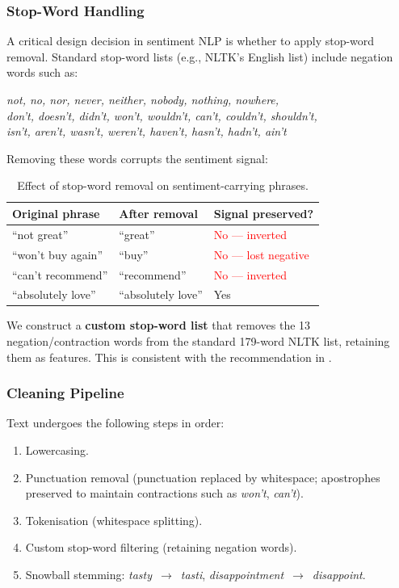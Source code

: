 \documentclass[11pt,a4paper]{article}
\begin{document}
\subsubsection{Stop-Word Handling}

A critical design decision in sentiment NLP is whether to apply
stop-word removal.
Standard stop-word lists (e.g., NLTK's English list) include negation words
such as:

\begin{center}
\textit{not, no, nor, never, neither, nobody, nothing, nowhere,\\
don't, doesn't, didn't, won't, wouldn't, can't, couldn't, shouldn't,\\
isn't, aren't, wasn't, weren't, haven't, hasn't, hadn't, ain't}
\end{center}

Removing these words corrupts the sentiment signal:

\begin{table}[H]
  \centering
  \caption{Effect of stop-word removal on sentiment-carrying phrases.}
  \label{tab:stopwords}
  \begin{tabular}{lll}
    \toprule
    \textbf{Original phrase} & \textbf{After removal} & \textbf{Signal preserved?} \\
    \midrule
    ``not great''        & ``great''      & \textcolor{red}{No --- inverted} \\
    ``won't buy again''  & ``buy''        & \textcolor{red}{No --- lost negative} \\
    ``can't recommend''  & ``recommend''  & \textcolor{red}{No --- inverted} \\
    ``absolutely love''  & ``absolutely love'' & \textcolor{green!60!black}{Yes} \\
    \bottomrule
  \end{tabular}
\end{table}

We construct a \textbf{custom stop-word list} that removes the 13
negation/contraction words from the standard 179-word NLTK list,
retaining them as features.
This is consistent with the recommendation in \citet{pang2002thumbs}.

\subsubsection{Cleaning Pipeline}

Text undergoes the following steps in order:

\begin{enumerate}[leftmargin=2em]
  \item Lowercasing.
  \item Punctuation removal (punctuation replaced by whitespace;
        apostrophes preserved to maintain contractions such as
        \textit{won't}, \textit{can't}).
  \item Tokenisation (whitespace splitting).
  \item Custom stop-word filtering (retaining negation words).
  \item Snowball stemming: \textit{tasty}~$\to$~\textit{tasti},
        \textit{disappointment}~$\to$~\textit{disappoint}.
\end{enumerate}
\end{document}
